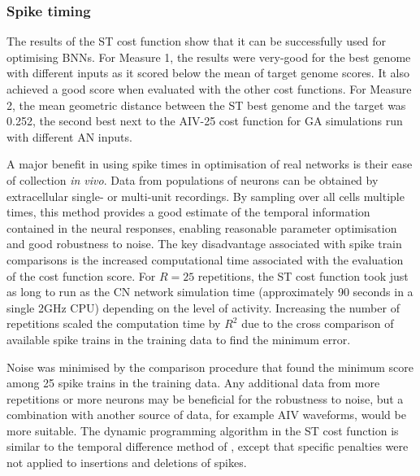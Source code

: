 \subsubsection{Spike timing}\label{sec:GA:spike-timing-summ}

The results of the ST cost function show that it can be successfully used for
optimising BNNs.  For Measure 1, the results were very-good for the best genome
with different inputs as it scored below the mean of target genome scores. It
also achieved a good score when evaluated with the other cost functions.  For
Measure 2, the mean geometric distance between the ST best genome and the target
was 0.252, the second best next to the AIV-25 cost function for GA simulations
run with different AN inputs.

\smallskip{}

A major benefit in using spike times in optimisation of real networks is their
ease of collection \textit{in vivo}. Data from populations of neurons can be
obtained by extracellular single- or multi-unit recordings.  By sampling over
all cells multiple times, this method provides a good estimate of the temporal
information contained in the neural responses, enabling reasonable parameter
optimisation and good robustness to noise.  The key disadvantage associated with
spike train comparisons is the increased computational time associated with the
evaluation of the cost function score.  For $R=25$ repetitions, the ST cost
function took just as long to run as the CN network simulation time
(approximately 90 seconds in a single 2GHz CPU) depending on the level of
activity. Increasing the number of repetitions scaled the computation time by
$R^2$ due to the cross comparison of available spike trains in the training data
to find the minimum error.

\smallskip{}

Noise was minimised by the comparison procedure that found the minimum
score among 25 spike trains in the training data. Any additional data from
more repetitions or more neurons may be beneficial for the robustness to
noise, but a combination with another source of data, for example AIV
waveforms, would be more suitable. The dynamic programming algorithm in the
ST cost function is similar to the temporal difference method of
\citet{VictorGoldbergEtAl:2007}, except that specific penalties were not
applied to insertions and deletions of spikes.


